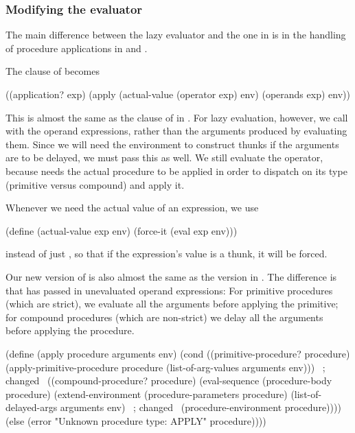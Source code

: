 \subsubsection*{Modifying the evaluator}

The main difference between the lazy evaluator and the one in 
is in the handling of procedure applications in  and .

The  clause of  becomes

\begin{codeBlock}
((application? exp)
 (apply (actual-value (operator exp) env)
        (operands exp)
        env))
\end{codeBlock}

\noindent
This is almost the same as the  clause of  in
.  For lazy evaluation, however, we call  with
the operand expressions, rather than the arguments produced by evaluating them.
Since we will need the environment to construct thunks if the arguments are to
be delayed, we must pass this as well.  We still evaluate the operator, because
 needs the actual procedure to be applied in order to dispatch on
its type (primitive versus compound) and apply it.

Whenever we need the actual value of an expression, we use

\begin{codeBlock}
(define (actual-value exp env)
  (force-it (eval exp env)))
\end{codeBlock}

\noindent
instead of just , so that if the expression's value is a thunk, it
will be forced.

Our new version of  is also almost the same as the version in
.  The difference is that  has passed in
unevaluated operand expressions: For primitive procedures (which are strict),
we evaluate all the arguments before applying the primitive; for compound
procedures (which are non-strict) we delay all the arguments before applying
the procedure.

\begin{codeBlock}
(define (apply procedure arguments env)
  (cond ((primitive-procedure? procedure)
         (apply-primitive-procedure
          procedure
          (list-of-arg-values arguments env)))   ~\textrm{; changed}~
        ((compound-procedure? procedure)
         (eval-sequence
          (procedure-body procedure)
          (extend-environment
           (procedure-parameters procedure)
           (list-of-delayed-args arguments env)  ~\textrm{; changed}~
           (procedure-environment procedure))))
        (else (error "Unknown procedure type: APPLY"
                     procedure))))
\end{codeBlock}

